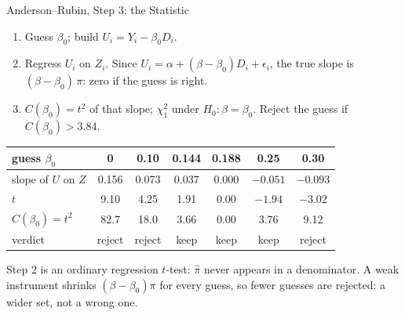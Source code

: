 \documentclass[aspectratio=169,11pt,xcolor=dvipsnames]{beamer}
\begin{document}
\begin{frame}{Anderson--Rubin, Step 3: the Statistic}
\begin{enumerate}\itemsep4pt
  \item Guess $\beta_0$; build $U_i = Y_i - \beta_0 D_i$.
  \item Regress $U_i$ on $Z_i$. Since $U_i = \alpha + (\beta - \beta_0) D_i + \epsilon_i$,
        the true slope is $(\beta - \beta_0)\,\pi$: zero if the guess is right.
  \item $C(\beta_0) = t^2$ of that slope; $\chi^2_1$ under $H_0\!: \beta = \beta_0$.
        Reject the guess if $C(\beta_0) > 3.84$.
\end{enumerate}
\vskip2pt
\begin{center}\small
\renewcommand{\arraystretch}{1.1}
\begin{tabular}{@{}lcccccc@{}}
\toprule
guess $\beta_0$ & 0 & 0.10 & 0.144 & 0.188 & 0.25 & 0.30 \\
\midrule
slope of $U$ on $Z$ & 0.156 & 0.073 & 0.037 & 0.000 & $-0.051$ & $-0.093$ \\
$t$ & 9.10 & 4.25 & 1.91 & 0.00 & $-1.94$ & $-3.02$ \\
$C(\beta_0) = t^2$ & 82.7 & 18.0 & 3.66 & 0.00 & 3.76 & 9.12 \\
verdict & reject & reject & keep & keep & keep & reject \\
\bottomrule
\end{tabular}
\end{center}
\vskip4pt
Step 2 is an ordinary regression $t$-test: $\hat\pi$ never appears in a
denominator. A weak instrument shrinks $(\beta - \beta_0)\pi$ for every guess,
so fewer guesses are rejected: a wider set, not a wrong one.
\end{frame}
\end{document}
